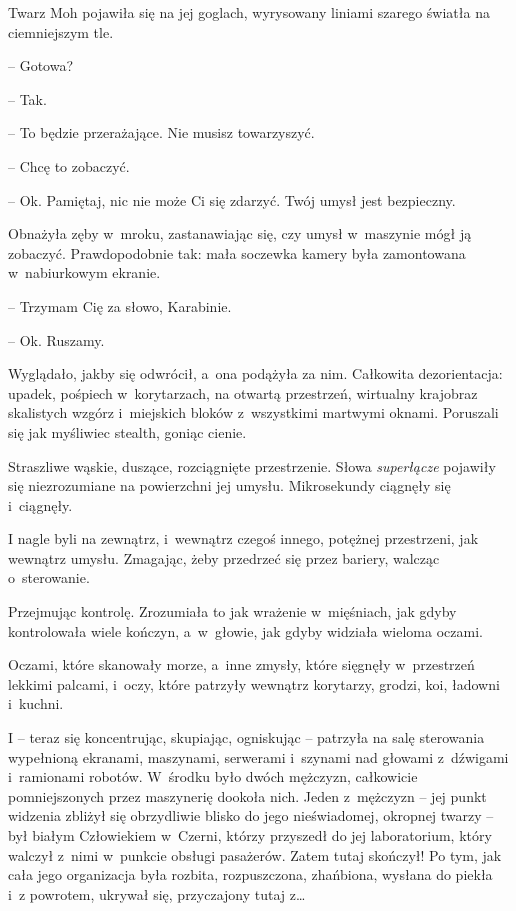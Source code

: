 \documentclass[oneside,polish,11pt,sfheadings]{mwbk}
\begin{document}
Twarz Moh pojawiła się na jej goglach, wyrysowany liniami szarego
światła na ciemniejszym tle.

-- Gotowa?

-- Tak.

-- To będzie przerażające. Nie musisz towarzyszyć.

-- Chcę to zobaczyć.

-- Ok. Pamiętaj, nic nie może Ci się zdarzyć. Twój umysł jest bezpieczny.

Obnażyła zęby w~mroku, zastanawiając się, czy umysł w~maszynie mógł ją
zobaczyć. Prawdopodobnie tak: mała soczewka kamery była zamontowana w~nabiurkowym ekranie.

-- Trzymam Cię za słowo, Karabinie.

-- Ok. Ruszamy.

Wyglądało, jakby się odwrócił, a~ona podążyła za nim. Całkowita
dezorientacja: upadek, pośpiech w~korytarzach, na otwartą przestrzeń,
wirtualny krajobraz skalistych wzgórz i~miejskich bloków z~wszystkimi
martwymi oknami. Poruszali się jak myśliwiec stealth, goniąc cienie.

Straszliwe wąskie, duszące, rozciągnięte przestrzenie. Słowa
\emph{superłącze} pojawiły się niezrozumiane na powierzchni jej umysłu.
Mikrosekundy ciągnęły się i~ciągnęły.

I nagle byli na zewnątrz, i~wewnątrz czegoś innego, potężnej
przestrzeni, jak wewnątrz umysłu. Zmagając, żeby przedrzeć się przez
bariery, walcząc o~sterowanie.

Przejmując kontrolę. Zrozumiała to jak wrażenie w~mięśniach, jak gdyby
kontrolowała wiele kończyn, a~w~głowie, jak gdyby widziała wieloma
oczami.

Oczami, które skanowały morze, a~inne zmysły, które sięgnęły w~przestrzeń lekkimi palcami, i~oczy, które patrzyły wewnątrz korytarzy,
grodzi, koi, ładowni i~kuchni.

I -- teraz się koncentrując, skupiając, ogniskując -- patrzyła na salę
sterowania wypełnioną ekranami, maszynami, serwerami i~szynami nad
głowami z~dźwigami i~ramionami robotów. W~środku było dwóch mężczyzn,
całkowicie pomniejszonych przez maszynerię dookoła nich. Jeden z~mężczyzn -- jej punkt widzenia zbliżył się obrzydliwie blisko do jego
nieświadomej, okropnej twarzy -- był białym Człowiekiem w~Czerni, którzy
przyszedł do jej laboratorium, który walczył z~nimi w~punkcie obsługi
pasażerów. Zatem tutaj skończył! Po tym, jak cała jego organizacja była
rozbita, rozpuszczona, zhańbiona, wysłana do piekła i~z powrotem,
ukrywał się, przyczajony tutaj z\ldots
\end{document}
